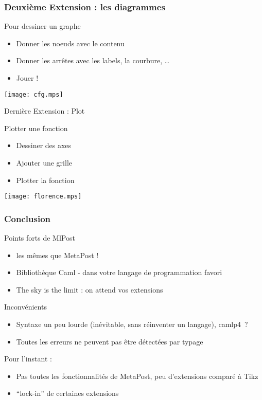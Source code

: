 \documentclass[nodefaultblocks]{beamer}
\begin{document}
\begin{frame}\frametitle{Deuxième Extension : les diagrammes}
  \begin{block}{Pour dessiner un graphe}
    \begin{itemize}
      \item Donner les noeuds avec le contenu
      \item Donner les arrêtes avec les labels, la courbure, \ldots
      \item Jouer ! 
    \end{itemize}
  \end{block}
  \begin{center}
    \texttt{[image: cfg.mps]}
  \end{center}
\end{frame}

\begin{frame}{Dernière Extension : Plot}
  \begin{block}{Plotter une fonction}
    \begin{itemize}
      \item Dessiner des axes
      \item Ajouter une grille
      \item Plotter la fonction 
    \end{itemize}
  \end{block}
  \begin{center}
    \texttt{[image: florence.mps]}
  \end{center}
\end{frame}

\begin{frame}\frametitle{Conclusion}

  \begin{block}{Points forts de MlPost}
    \begin{itemize}
      \item les mêmes que MetaPost ! 
      \item Bibliothèque Caml - dans votre langage de programmation favori
      \item The sky is the limit : on attend vos extensions
    \end{itemize}
  \end{block}
  
  \begin{block}{Inconvénients}
    \begin{itemize}
      \item Syntaxe un peu lourde (inévitable, sans réinventer un langage),
        camlp4~?
      \item Toutes les erreurs ne peuvent pas être détectées par typage
    \end{itemize}
    Pour l'instant :
    \begin{itemize}
      \item Pas toutes les fonctionnalités de MetaPost, peu d'extensions
        comparé à Tikz
      \item ``lock-in'' de certaines extensions
    \end{itemize}
  \end{block}
\end{frame}
\end{document}
